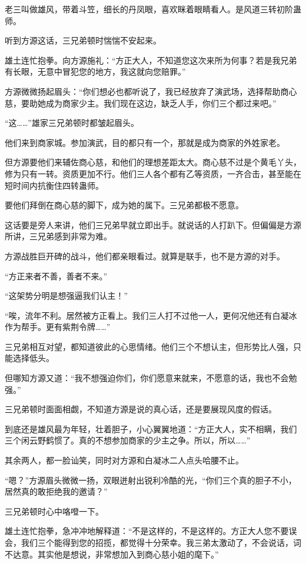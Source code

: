 \begin{this_body}
老三叫做雄风，带着斗笠，细长的丹凤眼，喜欢眯着眼睛看人。是风道三转初阶蛊师。

听到方源这话，三兄弟顿时惴惴不安起来。

雄土连忙抱拳。向方源施礼：“方正大人，不知道您这次来所为何事？若是我兄弟有长眼，无意中冒犯您的地方，我这就向您赔罪。”

方源微微扬起眉头：“你们想必也都听说了，我已经放弃了演武场，选择帮助商心慈，要助她成为商家少主。我们现在这边，缺乏人手，你们三个都过来吧。”

“这……”雄家三兄弟顿时都皱起眉头。

他们来到商家城。参加演武，目的都只有一个，那就是成为商家的外姓家老。

但方源要他们来辅佐商心慈，和他们的理想差距太大。商心慈不过是个黄毛丫头，修为只有一转。资质更加不行。他们三人各个都有乙等资质，一齐合击，甚至能在短时间内抗衡住四转蛊师。

要他们拜倒在商心慈的脚下，成为她的属下。三兄弟都极不愿意。

这话要是旁人来讲，他们三兄弟早就立即出手。就说话的人打趴下。但偏偏是方源所讲，三兄弟感到非常为难。

方源战胜巨开碑的战斗，他们都亲眼看过。就算是联手，也不是方源的对手。

“方正来者不善，善者不来。”

“这架势分明是想强逼我们认主！”

“唉，流年不利。居然被方正看上。我们三人打不过他一人，更何况他还有白凝冰作为帮手。更有紫荆令牌……”

三兄弟相互对望，都知道彼此的心思情绪。他们三个不想认主，但形势比人强，只能选择低头。

但哪知方源又道：“我不想强迫你们，你们愿意来就来，不愿意的话，我也不会勉强。”

三兄弟顿时面面相觑，不知道方源是说的真心话，还是要展现风度的假话。

到底还是雄风最为年轻，壮着胆子，小心翼翼地道：“方正大人，实不相瞒，我们三个闲云野鹤惯了。真的不想参加商家的少主之争。所以，所以……”

其余两人，都一脸讪笑，同时对方源和白凝冰二人点头哈腰不止。

“嗯？”方源眉头微微一扬，双眼迸射出锐利冷酷的光，“你们三个真的胆子不小，居然真的敢拒绝我的邀请？”

三兄弟顿时心中咯噔一下。

雄土连忙抱拳，急冲冲地解释道：“不是这样的，不是这样的。方正大人您不要误会，我们三个能得到您的招揽，都觉得十分荣幸。我三弟太激动了，不会说话，词不达意。其实他是想说，非常想加入到商心慈小姐的麾下。”


\end{this_body}
